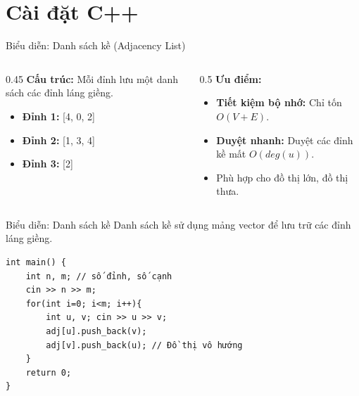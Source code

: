 \documentclass{beamer}
\begin{document}
\section{Cài đặt C++}
\begin{frame}{Biểu diễn: Danh sách kề (Adjacency List)}
    \begin{columns}
        \begin{column}{0.45\textwidth}
            \textbf{Cấu trúc:}
            Mỗi đỉnh lưu một danh sách các đỉnh láng giềng.
            \vspace{0.3cm}
            \begin{itemize}
                \item \textbf{Đỉnh 1:} [4, 0, 2]
                \item \textbf{Đỉnh 2:} [1, 3, 4]
                \item \textbf{Đỉnh 3:} [2]
            \end{itemize}
        \end{column}
        \begin{column}{0.5\textwidth}
            \textbf{Ưu điểm:}
            \begin{itemize}
                \item \textbf{Tiết kiệm bộ nhớ:} Chỉ tốn $O(V+E)$.
                \item \textbf{Duyệt nhanh:} Duyệt các đỉnh kề mất $O(deg(u))$.
                \item Phù hợp cho đồ thị lớn, đồ thị thưa.
            \end{itemize}
        \end{column}
    \end{columns}
\end{frame}
\begin{frame}[fragile]{Biểu diễn: Danh sách kề}
Danh sách kề sử dụng mảng vector để lưu trữ các đỉnh láng giềng.
\begin{verbatim}
int main() {
    int n, m; // số đỉnh, số cạnh
    cin >> n >> m;
    for(int i=0; i<m; i++){
        int u, v; cin >> u >> v;
        adj[u].push_back(v);
        adj[v].push_back(u); // Đồ thị vô hướng
    }
    return 0;
}
\end{verbatim}
\end{frame}
\end{document}
